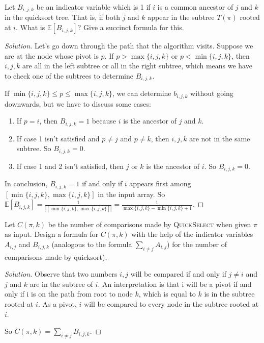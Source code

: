 


\maketitle

\begin{thm}{}{}
    Let $B_{i,j,k}$ be an indicator variable which is 1 if $i$ is a common ancestor of  $j$ and $k$ in the quicksort tree. That is, if both $j$ and $k$ appear in the subtree $T(\pi)$ rooted at $i$.
    What is $\mathbb{E}[B_{i,j,k}]$? Give a succinct formula for this.
\end{thm}

\begin{proof}[Solution]
	Let's go down through the path that the algorithm visits.
  	Suppose we are at the node whose pivot is $p$. If $p > \max\{i,j,k\}$ or $p < \min\{i,j,k\}$, then $i,j,k$ are all in the left subtree or all in the right subtree, which means we have to check one of the subtrees to determine $B_{i,j,k}$.
      
    If $\min\{i,j,k\} \leqslant p \leqslant \max\{i,j,k\}$, we can determine $b_{i,j,k}$ without going downwards, but we have to discuss some cases:
    \begin{enumerate}
        \item If $p=i$, then $B_{i,j,k}=1$ because $i$ is the ancestor of $j$ and $k$.
        \item If case 1 isn't satisfied and $p\ne j$ and $p\ne k$, then $i,j,k$ are not in the same subtree. So $B_{i,j,k}=0$.
        \item If case 1 and 2 isn't satisfied, then $j$ or $k$ is the ancestor of $i$. So $B_{i,j,k}=0$.
    \end{enumerate}
  	
  	In conclusion,  $B_{i,j,k}=1$ if and only if $i$ appears first among $[\min\{i,j,k\},\max\{i,j,k\}]$ in the input array. So  $\mathbb{E}[B_{i,j,k}]=\frac{1}{|[\min\{i,j,k\},\max\{i,j,k\}]|}=\frac{1}{\max\{i,j,k\}-\min\{i,j,k\}+1}$.
\end{proof}

\newpage

\begin{thm}{}{}
	Let $C(\pi,k)$ be the number of comparisons made by \textsc{QuickSelect} when given $\pi$ as input. Design a formula for $C(\pi,k)$ with the help of the indicator variables $A_{i,j}$ and $B_{i,j,k}$ (analogous to the formula $\sum_{i\ne j}A_{i,j}$) for the number of comparisons made by quicksort).
	
\end{thm}

\begin{proof}[Solution]
	Observe that two numbers $i,j$ will be compared if and only if $j\ne i$ and $j$ and $k$ are in the subtree of $i$. An interpretation is that i will be a pivot if and only if i is on the path from root to node $k$, which is equal to $k$ is in the subtree rooted at $i$. As a pivot, $i$ will be compared to every node in the subtree rooted at $i$.
	
	So $C(\pi,k)=\sum_{i\ne j}B_{i,j,k}$.
\end{proof}





